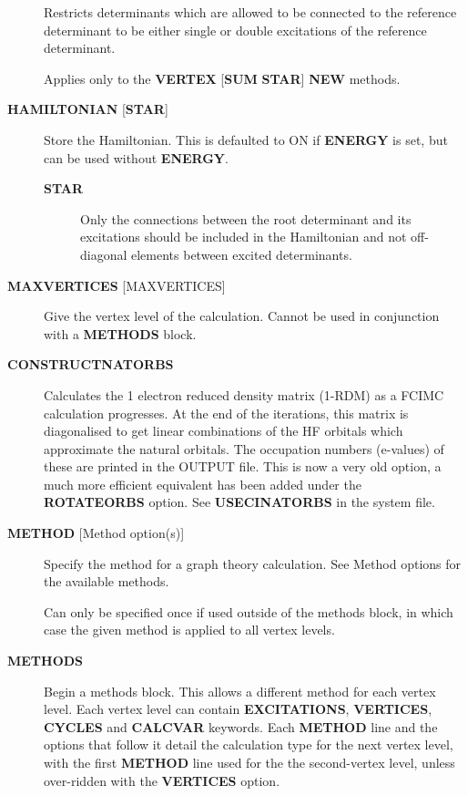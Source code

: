 \documentclass[openany,a4paper,10pt,english]{manual}
\begin{document}
\begin{description}
Restricts determinants which are allowed to be connected to the
reference determinant to be either single or double excitations of
the reference determinant.

Applies only to the \textbf{VERTEX} {[}\textbf{SUM} \textbf{STAR}{]} \textbf{NEW} methods.

\item[\textbf{HAMILTONIAN} {[}\textbf{STAR}{]}] \leavevmode
Store the Hamiltonian.  This is defaulted to ON if \textbf{ENERGY} is set,
but can be used without \textbf{ENERGY}.
\begin{description}
\item[\textbf{STAR}] \leavevmode
Only the connections between the root determinant and its
excitations should be included in the Hamiltonian and not
off-diagonal elements between excited determinants.

\end{description}

\item[\textbf{MAXVERTICES} {[}MAXVERTICES{]}] \leavevmode
Give the vertex level of the calculation.  Cannot be used in
conjunction with a \textbf{METHODS} block.

\item[\textbf{CONSTRUCTNATORBS}] \leavevmode
Calculates the 1 electron reduced density matrix (1-RDM) as a FCIMC
calculation progresses.  At the end of the iterations, this matrix
is diagonalised to get linear combinations of the HF orbitals which
approximate the natural orbitals.  The occupation numbers (e-values)
of these are printed in the OUTPUT file.
This is now a very old option, a much more efficient equivalent has
been added under the \textbf{ROTATEORBS} option.  See \textbf{USECINATORBS} in the
system file.

\item[\textbf{METHOD} {[}Method option(s){]}] \leavevmode
Specify the method for a graph theory calculation.  See Method
options for the available methods.

Can only be specified once if used outside of the methods block,
in which case the given method is applied to all vertex levels.

\item[\textbf{METHODS}] \leavevmode
Begin a methods block.  This allows a different method for each vertex
level.  Each vertex level can contain \textbf{EXCITATIONS}, \textbf{VERTICES},
\textbf{CYCLES} and \textbf{CALCVAR} keywords.
Each \textbf{METHOD} line and the options that follow it detail the calculation
type for the next vertex level, with the first \textbf{METHOD} line used for the
the second-vertex level, unless over-ridden with the \textbf{VERTICES} option.


\end{description}
\end{document}
